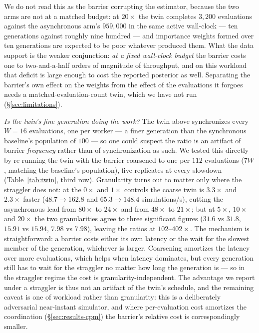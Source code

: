 We do not read this as the barrier corrupting the estimator, because the two arms are not at a matched budget: at $20\times$ the twin completes $3{,}200$ evaluations against the asynchronous arm's $959{,}000$ in the same active wall-clock --- ten generations against roughly nine hundred --- and importance weights formed over ten generations are expected to be poor whatever produced them. What the data support is the weaker conjunction: \emph{at a fixed wall-clock budget} the barrier costs one to two-and-a-half orders of magnitude of throughput, and on this workload that deficit is large enough to cost the reported posterior as well. Separating the barrier's own effect on the weights from the effect of the evaluations it forgoes needs a matched-evaluation-count twin, which we have not run (\S\ref{sec:limitations}).

\emph{Is the twin's fine generation doing the work?} The twin above synchronizes every $W{=}16$ evaluations, one per worker --- a finer generation than the synchronous baseline's population of $100$ --- so one could suspect the ratio is an artifact of barrier \emph{frequency} rather than of synchronization as such. We tested this directly by re-running the twin with the barrier coarsened to one per $112$ evaluations ($7W$, matching the baseline's population), five replicates at every slowdown (Table~\ref{tab:twin}, third row). Granularity turns out to matter only where the straggler does not: at the $0\times$ and $1\times$ controls the coarse twin is $3.3\times$ and $2.3\times$ faster ($48.7\to162.8$ and $65.3\to148.4$ simulations/s), cutting the asynchronous lead from $80\times$ to $24\times$ and from $48\times$ to $21\times$; but at $5\times$, $10\times$ and $20\times$ the two granularities agree to three significant figures ($31.6$ vs $31.8$, $15.91$ vs $15.94$, $7.98$ vs $7.98$), leaving the ratios at $102$--$402\times$. The mechanism is straightforward: a barrier costs either its own latency or the wait for the slowest member of the generation, whichever is larger. Coarsening amortizes the latency over more evaluations, which helps when latency dominates, but every generation still has to wait for the straggler no matter how long the generation is --- so in the straggler regime the cost is granularity-independent. The advantage we report under a straggler is thus not an artifact of the twin's schedule, and the remaining caveat is one of workload rather than granularity: this is a deliberately adversarial near-instant simulator, and where per-evaluation cost amortizes the coordination (\S\ref{sec:results-cpm}) the barrier's relative cost is correspondingly smaller.

